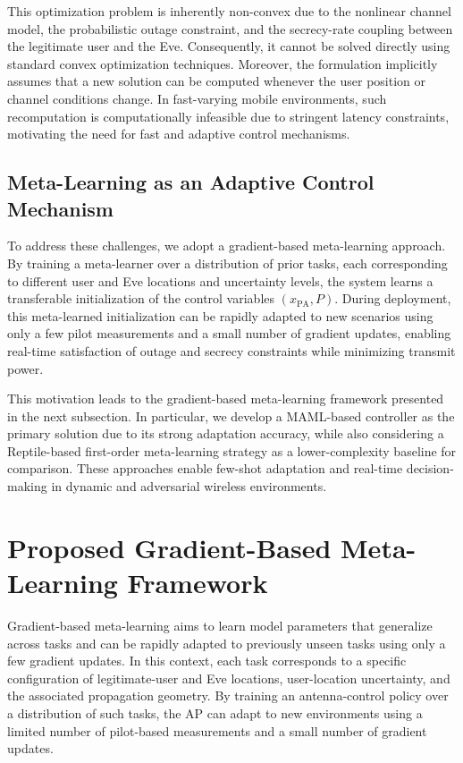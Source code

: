 \documentclass[journal,10pt]{IEEEtran}
\begin{document}
This optimization problem is inherently non-convex due to the nonlinear channel model, the probabilistic outage constraint, and the secrecy-rate coupling between the legitimate user and the Eve. Consequently, it cannot be solved directly using standard convex optimization techniques. Moreover, the formulation implicitly assumes that a new solution can be computed whenever the user position or channel conditions change. In fast-varying mobile environments, such recomputation is computationally infeasible due to stringent latency constraints, motivating the need for fast and adaptive control mechanisms.

\subsection{Meta-Learning as an Adaptive Control Mechanism}
To address these challenges, we adopt a gradient-based meta-learning approach. By training a meta-learner over a distribution of prior tasks, each corresponding to different user and Eve locations and uncertainty levels, the system learns a transferable initialization of the control variables $(x_{\mathrm{PA}}, P)$. During deployment, this meta-learned initialization can be rapidly adapted to new scenarios using only a few pilot measurements and a small number of gradient updates, enabling real-time satisfaction of outage and secrecy constraints while minimizing transmit power.

This motivation leads to the gradient-based meta-learning framework presented in the next subsection. In particular, we develop a MAML-based controller as the primary solution due to its strong adaptation accuracy, while also considering a Reptile-based first-order meta-learning strategy as a lower-complexity baseline for comparison. These approaches enable few-shot adaptation and real-time decision-making in dynamic and adversarial wireless environments.




\section{Proposed Gradient-Based Meta-Learning Framework}\label{sec_proposed_framework}
Gradient-based meta-learning aims to learn model parameters that generalize across tasks and can be rapidly adapted to previously unseen tasks using only a few gradient updates. In this context, each task corresponds to a specific configuration of legitimate-user and Eve locations, user-location uncertainty, and the associated propagation geometry. By training an antenna-control policy over a distribution of such tasks, the AP can adapt to new environments using a limited number of pilot-based measurements and a small number of gradient updates.
\end{document}

